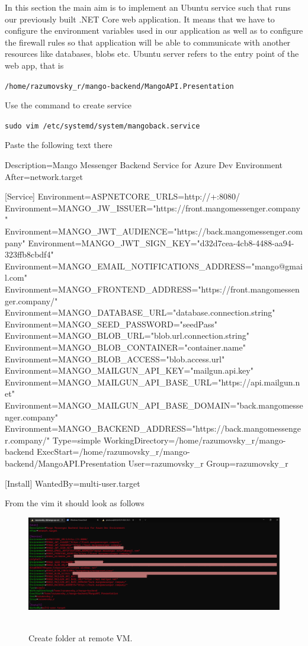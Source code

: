 In this section the main aim is to implement an Ubuntu service such that runs our previously built
.NET Core web application.
It means that we have to configure the environment variables used in our application
as well as to configure the firewall rules so that application will be able to communicate with
another resources like databases, blobs etc.
Ubuntu server refers to the entry point of the web app, that is
\begin{center}
    \texttt{/home/razumovsky\_r/mango-backend/MangoAPI.Presentation}
\end{center}
Use the command to create service
\begin{center}
    \texttt{sudo vim /etc/systemd/system/mangoback.service}
\end{center}
Paste the following text there
\begin{spverbatim}
[Unit]
    Description=Mango Messenger Backend Service for Azure Dev Environment
    After=network.target

    [Service]
    Environment=ASPNETCORE_URLS=http://+:8080/
    Environment=MANGO_JW_ISSUER="https://front.mangomessenger.company"
    Environment=MANGO_JWT_AUDIENCE="https://back.mangomessenger.company"
    Environment=MANGO_JWT_SIGN_KEY="d32d7cea-4cb8-4488-aa94-323ffb8cbdf4"
    Environment=MANGO_EMAIL_NOTIFICATIONS_ADDRESS="mango@gmail.com"
    Environment=MANGO_FRONTEND_ADDRESS="https://front.mangomessenger.company/"
    Environment=MANGO_DATABASE_URL="database.connection.string"
    Environment=MANGO_SEED_PASSWORD="seedPass"
    Environment=MANGO_BLOB_URL="blob.url.connection.string"
    Environment=MANGO_BLOB_CONTAINER="container.name"
    Environment=MANGO_BLOB_ACCESS="blob.access.url"
    Environment=MANGO_MAILGUN_API_KEY="mailgun.api.key"
    Environment=MANGO_MAILGUN_API_BASE_URL="https://api.mailgun.net"
    Environment=MANGO_MAILGUN_API_BASE_DOMAIN="back.mangomessenger.company"
    Environment=MANGO_BACKEND_ADDRESS="https://back.mangomessenger.company/"
    Type=simple
    WorkingDirectory=/home/razumovsky_r/mango-backend
    ExecStart=/home/razumovsky_r/mango-backend/MangoAPI.Presentation
    User=razumovsky_r
    Group=razumovsky_r

    [Install]
    WantedBy=multi-user.target
\end{spverbatim}
From the vim it should look as follows
\begin{figure}[H]
    \centering
    \includegraphics[width=1\textwidth]{img/05_ubuntu_service_vim}
    ~\caption{Create folder at remote VM.}\label{fig:figure13}
\end{figure}
